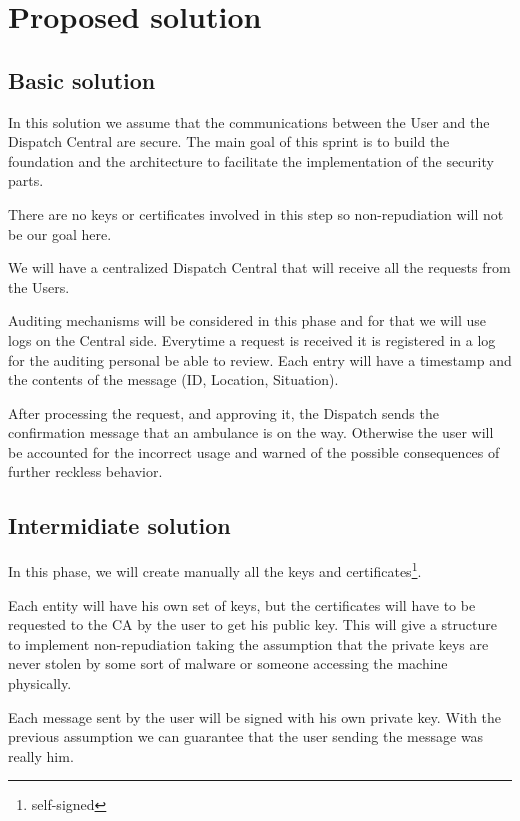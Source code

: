 \documentclass[a4paper,titlepage,11pt]{article}
\begin{document}
\section{Proposed solution}


\subsection{Basic solution}
In this solution we assume that the communications between the User and the Dispatch Central are secure.
The main goal of this sprint is to build the foundation and the architecture to facilitate the implementation of the security parts.

There are no keys or certificates involved in this step so non-repudiation will not be our goal here.

We will have a centralized Dispatch Central that will receive all the requests from the Users.

Auditing mechanisms will be considered in this phase and for that we will use logs on the Central side.
Everytime a request is received it is registered in a log for the auditing personal be able to review.
Each entry will have a timestamp and the contents of the message (ID, Location, Situation).

After processing the request, and approving it, the Dispatch sends the confirmation message that an ambulance is on the way.
Otherwise the user will be accounted for the incorrect usage and warned of the possible consequences of further reckless behavior.

\subsection{Intermidiate solution}
In this phase, we will create manually all the keys and certificates\footnote{self-signed}.

Each entity will have his own set of keys, but the certificates will have to be requested to the CA by the user to get his public key.        %
This will give a structure to implement non-repudiation taking the assumption that the private keys are never stolen
by some sort of malware or someone accessing the machine physically.

Each message sent by the user will be signed with his own private key.
With the previous assumption we can guarantee that the user sending the message was really him.
\end{document}
